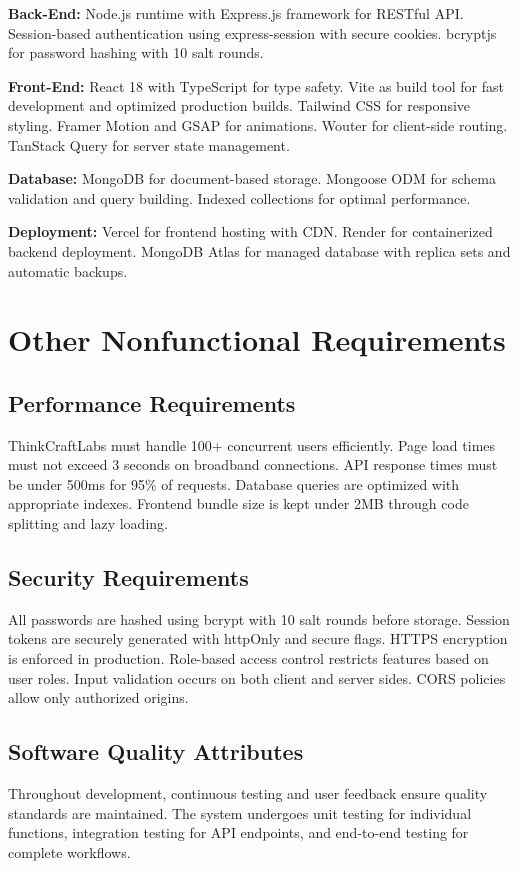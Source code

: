 \documentclass{scrreprt}
\begin{document}
\textbf{Back-End:} Node.js runtime with Express.js framework for RESTful API. Session-based authentication using express-session with secure cookies. bcryptjs for password hashing with 10 salt rounds.

\textbf{Front-End:} React 18 with TypeScript for type safety. Vite as build tool for fast development and optimized production builds. Tailwind CSS for responsive styling. Framer Motion and GSAP for animations. Wouter for client-side routing. TanStack Query for server state management.

\textbf{Database:} MongoDB for document-based storage. Mongoose ODM for schema validation and query building. Indexed collections for optimal performance.

\textbf{Deployment:} Vercel for frontend hosting with CDN. Render for containerized backend deployment. MongoDB Atlas for managed database with replica sets and automatic backups.

\chapter{Other Nonfunctional Requirements}

\section{Performance Requirements}
ThinkCraftLabs must handle 100+ concurrent users efficiently. Page load times must not exceed 3 seconds on broadband connections. API response times must be under 500ms for 95\% of requests. Database queries are optimized with appropriate indexes. Frontend bundle size is kept under 2MB through code splitting and lazy loading.

\section{Security Requirements}
All passwords are hashed using bcrypt with 10 salt rounds before storage. Session tokens are securely generated with httpOnly and secure flags. HTTPS encryption is enforced in production. Role-based access control restricts features based on user roles. Input validation occurs on both client and server sides. CORS policies allow only authorized origins.

\section{Software Quality Attributes}
Throughout development, continuous testing and user feedback ensure quality standards are maintained. The system undergoes unit testing for individual functions, integration testing for API endpoints, and end-to-end testing for complete workflows.
\end{document}
